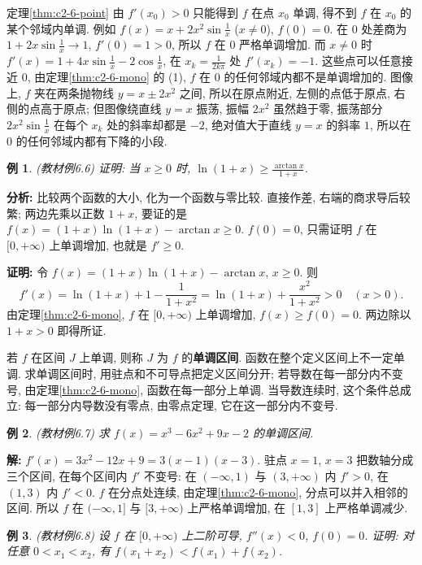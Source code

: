 \documentclass[UTF8,openany]{ctexbook}
\theoremstyle{chinesetextbook}
\newtheorem{example}{例}[section]
\newenvironment{cnproof}{\par\indent\textbf{证明:} \ignorespaces}{\par}
\newenvironment{cnsolution}{\par\indent\textbf{解:} \ignorespaces}{\par}
\begin{document}
定理\ref{thm:c2-6-point} 由 $f'(x_0)>0$ 只能得到 $f$ 在点 $x_0$ 单调, 得不到 $f$ 在 $x_0$ 的某个邻域内单调. 例如 $\displaystyle f(x)=x+2x^2\sin\frac1x$ ($x\ne0$), $f(0)=0$. 在 $0$ 处差商为 $\displaystyle1+2x\sin\frac1x\to1$, $f'(0)=1>0$, 所以 $f$ 在 $0$ 严格单调增加. 而 $x\ne0$ 时 $\displaystyle f'(x)=1+4x\sin\frac1x-2\cos\frac1x$, 在 $\displaystyle x_k=\frac1{2k\pi}$ 处 $f'(x_k)=-1$. 这些点可以任意接近 $0$, 由定理\ref{thm:c2-6-mono} 的 (1), $f$ 在 $0$ 的任何邻域内都不是单调增加的. 图像上, $f$ 夹在两条抛物线 $y=x\pm2x^2$ 之间, 所以在原点附近, 左侧的点低于原点, 右侧的点高于原点; 但图像绕直线 $y=x$ 振荡, 振幅 $2x^2$ 虽然趋于零, 振荡部分 $\displaystyle2x^2\sin\frac1x$ 在每个 $x_k$ 处的斜率却都是 $-2$, 绝对值大于直线 $y=x$ 的斜率 $1$, 所以在 $0$ 的任何邻域内都有下降的小段.
\begin{example}\label{ex:c2-6-6}
\textnormal{(教材例6.6)} 证明: 当 $x\ge0$ 时, $\displaystyle\ln(1+x)\ge\frac{\arctan x}{1+x}$.
\end{example}
\par\indent\textbf{分析:} 比较两个函数的大小, 化为一个函数与零比较. 直接作差, 右端的商求导后较繁; 两边先乘以正数 $1+x$, 要证的是 $f(x)=(1+x)\ln(1+x)-\arctan x\ge0$. $f(0)=0$, 只需证明 $f$ 在 $[0,+\infty)$ 上单调增加, 也就是 $f'\ge0$.
\begin{cnproof}
令 $f(x)=(1+x)\ln(1+x)-\arctan x$, $x\ge0$. 则
\[
f'(x)=\ln(1+x)+1-\frac1{1+x^2}=\ln(1+x)+\frac{x^2}{1+x^2}>0\quad(x>0).
\]
由定理\ref{thm:c2-6-mono}, $f$ 在 $[0,+\infty)$ 上单调增加, $f(x)\ge f(0)=0$. 两边除以 $1+x>0$ 即得所证.
\end{cnproof}
若 $f$ 在区间 $J$ 上单调, 则称 $J$ 为 $f$ 的\textbf{单调区间}. 函数在整个定义区间上不一定单调. 求单调区间时, 用驻点和不可导点把定义区间分开; 若导数在每一部分内不变号, 由定理\ref{thm:c2-6-mono}, 函数在每一部分上单调. 当导数连续时, 这个条件总成立: 每一部分内导数没有零点, 由零点定理, 它在这一部分内不变号.
\begin{example}\label{ex:c2-6-7}
\textnormal{(教材例6.7)} 求 $f(x)=x^3-6x^2+9x-2$ 的单调区间.
\end{example}
\begin{cnsolution}
$f'(x)=3x^2-12x+9=3(x-1)(x-3)$. 驻点 $x=1$, $x=3$ 把数轴分成三个区间, 在每个区间内 $f'$ 不变号: 在 $(-\infty,1)$ 与 $(3,+\infty)$ 内 $f'>0$, 在 $(1,3)$ 内 $f'<0$. $f$ 在分点处连续, 由定理\ref{thm:c2-6-mono}, 分点可以并入相邻的区间. 所以 $f$ 在 $(-\infty,1]$ 与 $[3,+\infty)$ 上严格单调增加, 在 $[1,3]$ 上严格单调减少.
\end{cnsolution}
\begin{example}\label{ex:c2-6-8}
\textnormal{(教材例6.8)} 设 $f$ 在 $[0,+\infty)$ 上二阶可导, $f''(x)<0$, $f(0)=0$. 证明: 对任意 $0<x_1<x_2$, 有 $f(x_1+x_2)<f(x_1)+f(x_2)$.
\end{example}
\end{document}
